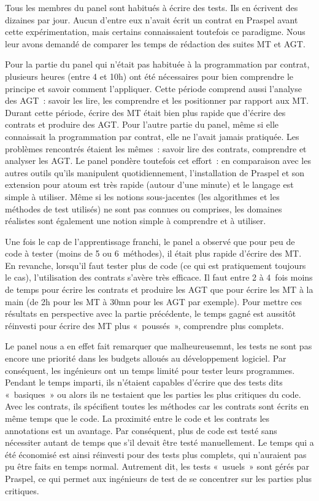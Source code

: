 Tous les membres du panel sont habitués à écrire des tests. Ils en écrivent des
dizaines par jour. Aucun d'entre eux n'avait écrit un contrat en Praspel avant
cette expérimentation, mais certains connaissaient toutefois ce paradigme. Nous
leur avons demandé de comparer les temps de rédaction des suites MT et AGT.

Pour la partie du panel qui n'était pas habituée à la programmation par contrat,
plusieurs heures (entre 4 et 10h) ont été nécessaires pour bien comprendre le
principe et savoir comment l'appliquer. Cette période comprend aussi l'analyse
des AGT~: savoir les lire, les comprendre et les positionner par rapport aux MT.
Durant cette période, écrire des MT était bien plus rapide que d'écrire des
contrats et produire des AGT. Pour l'autre partie du panel, même si elle
connaissait la programmation par contrat, elle ne l'avait jamais pratiquée. Les
problèmes rencontrés étaient les mêmes~: savoir lire des contrats, comprendre et
analyser les AGT. Le panel pondère toutefois cet effort~: en comparaison avec
les autres outils qu'ils manipulent quotidiennement, l'installation de Praspel
et son extension pour atoum est très rapide (autour d'une minute) et le langage
est simple à utiliser. Même si les notions sous-jacentes (les algorithmes et les
méthodes de test utilisés) ne sont pas connues ou comprises, les domaines
réalistes sont également une notion simple à comprendre et à utiliser.

Une fois le cap de l'apprentissage franchi, le panel a observé que pour peu de
code à tester (moins de 5 ou 6~méthodes), il était plus rapide d'écrire des MT.
En revanche, lorsqu'il faut tester plus de code (ce qui est pratiquement
toujours le cas), l'utilisation des contrats s'avère très efficace. Il faut
entre 2 à 4~fois moins de temps pour écrire les contrats et produire les AGT que
pour écrire les MT à la main (de 2h pour les MT à 30mn pour les AGT par
exemple). Pour mettre ces résultats en perspective avec la partie précédente, le
temps gagné est aussitôt réinvesti pour écrire des MT plus «~poussés~»,
comprendre plus complets.

Le panel nous a en effet fait remarquer que malheureusemnt, les tests ne sont
pas encore une priorité dans les budgets alloués au développement logiciel. Par
conséquent, les ingénieurs ont un temps limité pour tester leurs programmes.
Pendant le temps imparti, ils n'étaient capables d'écrire que des tests dits
«~basiques~» ou alors ils ne testaient que les parties les plus critiques du
code. Avec les contrats, ils spécifient toutes les méthodes car les contrats
sont écrits en même temps que le code. La proximité entre le code et les
contrats \via les annotations est un avantage. Par conséquent, plus de code est
testé sans nécessiter autant de temps que s'il devait être testé manuellement.
Le temps qui a été économisé est ainsi réinvesti pour des tests plus complets,
qui n'auraient pas pu être faits en temps normal. Autrement dit, les tests
«~usuels~» sont gérés par Praspel, ce qui permet aux ingénieurs de test de se
concentrer sur les parties plus critiques.

